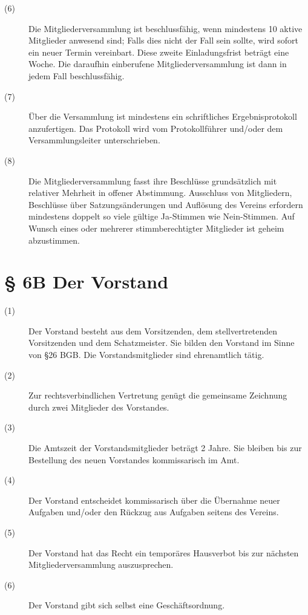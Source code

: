 \documentclass[a4paper,12pt]{scrartcl}
\begin{document}
\begin{description}
\item[(6)] Die Mitgliederversammlung ist beschlussfähig, wenn mindestens 10 aktive Mitglieder anwesend sind; Falls dies nicht der Fall sein sollte, wird sofort ein neuer Termin vereinbart. Diese zweite Einladungsfrist beträgt eine Woche. Die daraufhin einberufene Mitgliederversammlung ist dann in jedem Fall beschlussfähig.
\item[(7)] Über die Versammlung ist mindestens ein schriftliches Ergebnisprotokoll anzufertigen. Das Protokoll wird vom Protokollführer und/oder dem Versammlungsleiter unterschrieben.
\item[(8)] Die Mitgliederversammlung fasst ihre Beschlüsse grundsätzlich mit relativer Mehrheit in offener Abstimmung. Ausschluss von Mitgliedern, Beschlüsse über Satzungsänderungen und Auflösung des Vereins erfordern mindestens doppelt so viele gültige Ja-Stimmen wie Nein-Stimmen. Auf Wunsch eines oder mehrerer stimmberechtigter Mitglieder ist geheim abzustimmen.

\end{description}



\section*{\S{} 6B Der Vorstand}
\begin{description} 

\item[(1)] Der Vorstand besteht aus dem Vorsitzenden, dem stellvertretenden Vorsitzenden und dem Schatzmeister. Sie bilden den Vorstand im Sinne von §26 BGB. Die Vorstandsmitglieder sind ehrenamtlich tätig.
\item[(2)] Zur rechtsverbindlichen Vertretung genügt die gemeinsame Zeichnung durch zwei Mitglieder des Vorstandes.
\item[(3)] Die Amtszeit der Vorstandsmitglieder beträgt 2 Jahre. Sie bleiben bis zur Bestellung des neuen Vorstandes kommissarisch im Amt.
\item[(4)] Der Vorstand entscheidet kommissarisch über die Übernahme neuer Aufgaben und/oder den Rückzug aus Aufgaben seitens des Vereins. %
\item[(5)] Der Vorstand hat das Recht ein temporäres Hausverbot bis zur nächsten Mitgliederversammlung auszusprechen. 
\item[(6)] Der Vorstand gibt sich selbst eine Geschäftsordnung.

\end{description}
\end{document}
